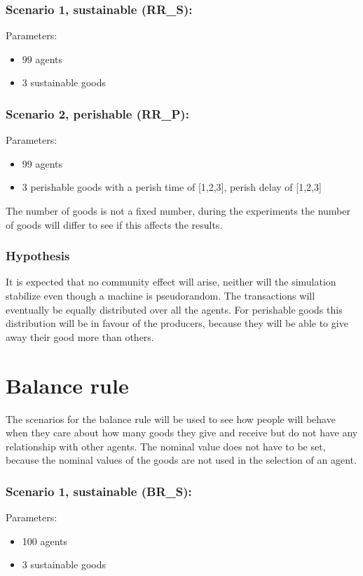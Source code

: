 \documentclass[twoside,openright]{uva-bachelor-thesis}
\begin{document}
\subsubsection{Scenario 1, sustainable (RR\_S):}
Parameters:
\begin{itemize}
\item 99 agents
\item 3 sustainable goods
\end{itemize}
\subsubsection{Scenario 2, perishable (RR\_P):}
Parameters:
\begin{itemize}
\item 99 agents
\item 3 perishable goods with a perish time of [1,2,3], perish delay of [1,2,3]
\end{itemize}
The number of goods is not a fixed number, during the experiments the number of goods will differ to see if this affects the results.

\subsubsection{Hypothesis}
It is expected that no community effect will arise, neither will the simulation stabilize even though a machine is pseudorandom. The transactions will eventually be equally distributed over all the agents. For perishable goods this distribution will be in favour of the producers, because they will be able to give away their good more than others.

\section{Balance rule}
The scenarios for the balance rule will be used to see how people will behave when they care about how many goods they give and receive but do not have any relationship with other agents. The nominal value does not have to be set, because the nominal values of the goods are not used in the selection of an agent.
\subsubsection{Scenario 1, sustainable (BR\_S):}
Parameters:
\begin{itemize}
\item 100 agents
\item 3 sustainable goods
\end{itemize}
\end{document}
